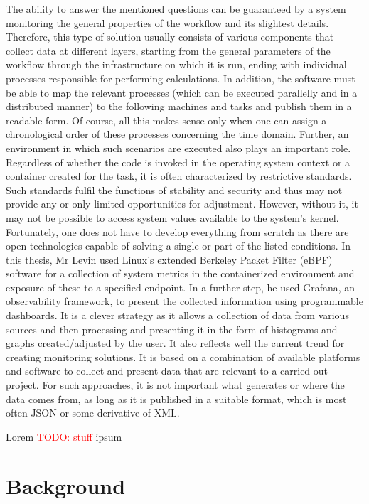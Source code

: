 \documentclass[lettersize,journal]{IEEEtran}
\newcommand{\todo}[1]{\textcolor{red}{TODO: #1}\PackageWarning{TODO:}{#1!}}
\begin{document}
The ability to answer the mentioned questions can be guaranteed by a system monitoring the general properties of the workflow and its slightest details. Therefore, this type of solution usually consists of various components that collect data at different layers, starting from the general parameters of the workflow through the infrastructure on which it is run, ending with individual processes responsible for performing calculations. In addition, the software must be able to map the relevant processes (which can be executed parallelly and in a distributed manner) to the following machines and tasks and publish them in a readable form. Of course, all this makes sense only when one can assign a chronological order of these processes concerning the time domain. Further, an environment in which such scenarios are executed also plays an important role. Regardless of whether the code is invoked in the operating system context or a container created for the task, it is often characterized by restrictive standards. Such standards fulfil the functions of stability and security and thus may not provide any or only limited opportunities for adjustment. However, without it, it may not be possible to access system values available to the system's kernel. 
Fortunately, one does not have to develop everything from scratch as there are open technologies capable of solving a single or part of the listed conditions. In this thesis\cite{viperProbe}, Mr Levin used Linux’s extended Berkeley Packet Filter (eBPF)\cite{ebpf} software for a collection of system metrics in the containerized environment and exposure of these to a specified endpoint. In a further step, he used Grafana\cite{grafana}, an observability framework, to present the collected information using programmable dashboards. It is a clever strategy as it allows a collection of data from various sources and then processing and presenting it in the form of histograms and graphs created/adjusted by the user. It also reflects well the current trend for creating monitoring solutions. It is based on a combination of available platforms and software to collect and present data that are relevant to a carried-out project. For such approaches, it is not important what generates or where the data comes from, as long as it is published in a suitable format, which is most often JSON or some derivative of XML.

Lorem \todo{stuff} ipsum

\section{Background}
\end{document}
